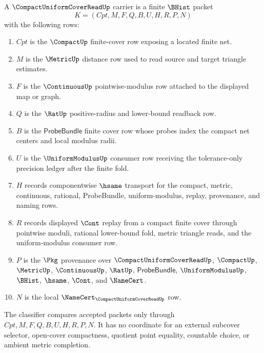 \begin{definition}
\label{def:compact-uniform-cover-read-carrier}
A $\CompactUniformCoverReadUp$ carrier is a finite $\BHist$ packet
$$
K=(Cpt,M,F,Q,B,U,H,R,P,N)
$$
with the following rows:
\begin{enumerate}
\item $Cpt$ is the $\CompactUp$ finite-cover row exposing a located finite net.
\item $M$ is the $\MetricUp$ distance row used to read source and target triangle estimates.
\item $F$ is the $\ContinuousUp$ pointwise-modulus row attached to the displayed map or graph.
\item $Q$ is the $\RatUp$ positive-radius and lower-bound readback row.
\item $B$ is the $\mathsf{ProbeBundle}$ finite cover row whose probes index the compact net centers and local modulus radii.
\item $U$ is the $\UniformModulusUp$ consumer row receiving the tolerance-only precision ledger after the finite fold.
\item $H$ records componentwise $\hsame$ transport for the compact, metric, continuous, rational, ProbeBundle, uniform-modulus, replay, provenance, and naming rows.
\item $R$ records displayed $\Cont$ replay from a compact finite cover through pointwise moduli, rational lower-bound fold, metric triangle reads, and the uniform-modulus consumer row.
\item $P$ is the $\Pkg$ provenance over $\CompactUniformCoverReadUp$, $\CompactUp$, $\MetricUp$, $\ContinuousUp$, $\RatUp$, $\mathsf{ProbeBundle}$, $\UniformModulusUp$, $\BHist$, $\hsame$, $\Cont$, and $\NameCert$.
\item $N$ is the local $\NameCert_{\CompactUniformCoverReadUp}$ row.
\end{enumerate}
The classifier compares accepted packets only through $Cpt,M,F,Q,B,U,H,R,P,N$. It has no coordinate for an external subcover selector, open-cover compactness, quotient point equality, countable choice, or ambient metric completion.
\end{definition}

